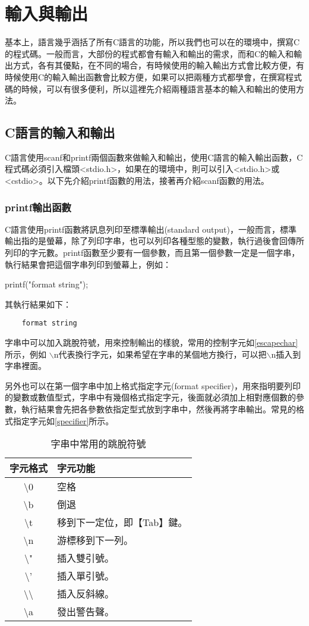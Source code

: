 \chapter{輸入與輸出}
基本上，\cc{}語言幾乎涵括了所有C語言的功能，所以我們也可以在\cc{}的環境中，撰寫C的程式碼。一般而言，大部份的程式都會有輸入和輸出的需求，而\cc{}和C的輸入和輸出方式，各有其優點，在不同的場合，有時候使用\cc{}的輸入輸出方式會比較方便，有時候使用C的輸入輸出函數會比較方便，如果可以把兩種方式都學會，在撰寫程式碼的時候，可以有很多便利，所以這裡先介紹兩種語言基本的輸入和輸出的使用方法。

\section{C語言的輸入和輸出}
C語言使用scanf和printf兩個函數來做輸入和輸出，使用C語言的輸入輸出函數，C程式碼必須引入檔頭<stdio.h>，如果在\cc{}的環境中，則可以引入<stdio.h>或<cstdio>。以下先介紹printf函數的用法，接著再介紹scanf函數的用法。

\subsection {printf輸出函數}
C語言使用printf函數將訊息列印至標準輸出(standard output)，一般而言，標準輸出指的是螢幕，除了列印字串，也可以列印各種型態的變數，執行過後會回傳所列印的字元數。printf函數至少要有一個參數，而且第一個參數一定是一個字串，執行結果會把這個字串列印到螢幕上，例如：
\begin{inside}
	printf("format string");
\end{inside}
其執行結果如下：
\begin{Verbatim}
    format string
\end{Verbatim}
字串中可以加入跳脫符號，用來控制輸出的樣貌，常用的控制字元如\autoref{escapechar}所示，例如
$\backslash$n代表換行字元，如果希望在字串的某個地方換行，可以把$\backslash$n插入到字串裡面。

另外也可以在第一個字串中加上格式指定字元(format specifier)，用來指明要列印的變數或數值型式，字串中有幾個格式指定字元，後面就必須加上相對應個數的參數，執行結果會先把各參數依指定型式放到字串中，然後再將字串輸出。常見的格式指定字元如\autoref{specifier}所示。

\begin{table}[h]
\centering
\caption{字串中常用的跳脫符號}
\begin{tabular}{|c|l|}
	\hline
	\rowcolor{dhscodebg}
	字元格式 & 字元功能\\
	\hline
	\textbackslash 0& 空格\\
	\hline
	\textbackslash b& 倒退\\
	\hline
	\textbackslash t&移到下一定位，即【Tab】鍵。\\
	\hline
	\textbackslash n&游標移到下一列。\\
	\hline
	\textbackslash "&插入雙引號。\\
	\hline
	\textbackslash '&插入單引號。\\
	\hline
	\textbackslash \textbackslash&插入反斜線。\\
	\hline
	\textbackslash a &發出警告聲。\\
	\hline
\end{tabular}
\label{escapechar}
\end{table}

